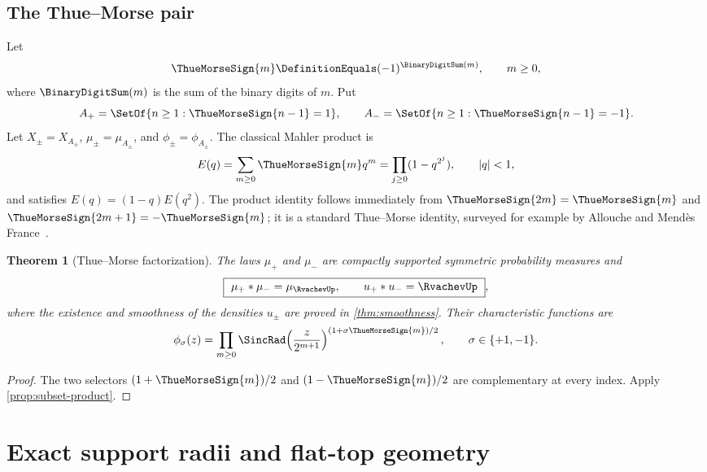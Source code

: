 \documentclass[11pt,oneside]{article}
\numberwithin{equation}{section}
\newtheorem{theorem}{Theorem}[section]
\theoremstyle{definition}
\theoremstyle{remark}
\begin{document}
\subsection{The Thue--Morse pair}

Let
\begin{equation}
 \ThueMorseSign{m}\DefinitionEquals(-1)^{\BinaryDigitSum(m)},\qquad m\ge0,
 \label{eq:tm-sign}
\end{equation}
where $\BinaryDigitSum(m)$ is the sum of the binary digits of $m$.  Put
\begin{equation}
 A_+=\SetOf{n\ge1:\ThueMorseSign{n-1}=1},
 \qquad
 A_-=\SetOf{n\ge1:\ThueMorseSign{n-1}=-1}.
 \label{eq:Apm}
\end{equation}
Let $X_\pm=X_{A_\pm}$, $\mu_\pm=\mu_{A_\pm}$, and $\phi_\pm=\phi_{A_\pm}$.  The classical
Mahler product is
\begin{equation}
 E(q)=\sum_{m\ge0}\ThueMorseSign{m}q^m
 =\prod_{j\ge0}(1-q^{2^j}),
 \qquad |q|<1,
 \label{eq:Eq}
\end{equation}
and satisfies $E(q)=(1-q)E(q^2)$.  The product identity follows immediately from
$\ThueMorseSign{2m}=\ThueMorseSign{m}$ and $\ThueMorseSign{2m+1}=-\ThueMorseSign{m}$; it is a standard Thue--Morse identity, surveyed for
example by Allouche and Mend\`es France~\cite{AlloucheMendesFrance2008}.

\begin{theorem}[Thue--Morse factorization]
\label{thm:tm-factorization}
The laws $\mu_+$ and $\mu_-$ are compactly supported symmetric probability measures and
\begin{equation}
 \boxed{\ \mu_+*\mu_-=\mu_{\RvachevUp},\qquad
 u_+*u_-=\RvachevUp\ },
 \label{eq:main-factorization}
\end{equation}
where the existence and smoothness of the densities $u_\pm$ are proved in
\cref{thm:smoothness}.  Their characteristic functions are
\begin{equation}
 \phi_\sigma(z)=\prod_{m\ge0}
 \SincRad\!\left(\frac z{2^{m+1}}\right)^{(1+\sigma\ThueMorseSign{m})/2},
 \qquad \sigma\in\{+1,-1\}.
 \label{eq:phi-pm}
\end{equation}
\end{theorem}

\begin{proof}
The two selectors $(1+\ThueMorseSign{m})/2$ and $(1-\ThueMorseSign{m})/2$ are complementary at every index.  Apply
\cref{prop:subset-product}.
\end{proof}

\section{Exact support radii and flat-top geometry}
\label{sec:support-plateau}
\end{document}
